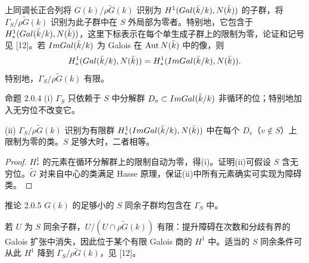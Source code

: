 上同调长正合列将 $G(k)/\rho\widetilde G(k)$ 识别为 $H^1(Gal(\bar k/k),N(\bar k))$ 的子群，将 $\Gamma_S/\rho\widetilde G(k)$ 识别为此子群中在 $S$ 外局部为零者。特别地，它包含于 $H_*^1(Gal(\bar k/k),N(\bar k))$，这里下标表示在每个单生成子群上的限制为零，论证和记号见 [12]。若 $ImGal(\bar k/k)$ 为 Galois 在 $\Aut N(\bar k)$ 中的像，则
\[
 H_*^1(Gal(\bar k/k),N(\bar k))
 =H_*^1(ImGal(\bar k/k),N(\bar k)).
\]
特别地，$\Gamma_S/\rho\widetilde G(k)$ 有限。
\begin{originaltheorem}{命题 2.0.4}
(i) $\Gamma_S$ 只依赖于 $S$ 中分解群 $D_v\subset ImGal(\bar k/k)$ 非循环的位；特别地加入无穷位不改变它。

(ii) $\Gamma_S/\rho\widetilde G(k)$ 识别为有限群 $H_*^1(ImGal(\bar k/k),N(\bar k))$ 中在每个 $D_v$（$v\notin S$）上限制为零的类。$S$ 足够大时，二者相等。
\end{originaltheorem}
\begin{proof}
$H_*^1$ 的元素在循环分解群上的限制自动为零，得(i)。证明(ii)可假设 $S$ 含无穷位。$\widetilde G$ 对来自中心的类满足 Hasse 原理，保证(ii)中所有元素确实可实现为障碍类。
\end{proof}
\begin{originaltheorem}{推论 2.0.5}
$G(k)$ 的足够小的 $S$ 同余子群均包含在 $\Gamma_S$ 中。
\end{originaltheorem}
若 $U$ 为 $S$ 同余子群，$U/(U\cap\rho\widetilde G(k))$ 有限：提升障碍在次数和分歧有界的 Galois 扩张中消失，因此位于某个有限 Galois 商的 $H^1$ 中。适当的 $S$ 同余条件可从此 $H^1$ 降到 $\Gamma_S/\rho\widetilde G(k)$，见 [12]。
